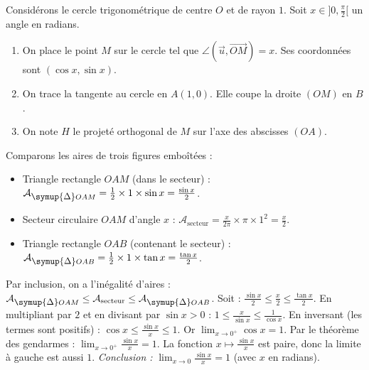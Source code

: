 \documentclass[11pt]{article}
\newcommand{\cle}[1]{{\popxbold\color{popdark}#1}}
\def\triangle{\mathord{\scalebox{0.9}{$\symup{\Delta}$}}}%
\begin{document}
\begin{experience}[Démonstration géométrique de $\lim_{x \to 0} \frac{\sin x}{x} = 1$]
Considérons le cercle trigonométrique de centre $O$ et de rayon $1$. Soit $x \in ]0, \frac{\pi}{2}[$ un angle en \cle{radians}.
\begin{enumerate}
    \item On place le point $M$ sur le cercle tel que $\angle(\vec{u}, \vec{OM}) = x$. Ses coordonnées sont $(\cos x, \sin x)$.
    \item On trace la tangente au cercle en $A(1,0)$. Elle coupe la droite $(OM)$ en $B$.
    \item On note $H$ le projeté orthogonal de $M$ sur l'axe des abscisses $(OA)$.
\end{enumerate}
Comparons les aires de trois figures emboîtées :
\begin{itemize}
    \item Triangle rectangle $OAM$ (dans le secteur) : $\mathcal{A}_{\triangle OAM} = \frac{1}{2} \times 1 \times \sin x = \frac{\sin x}{2}$.
    \item Secteur circulaire $OAM$ d'angle $x$ : $\mathcal{A}_{\text{secteur}} = \frac{x}{2\pi} \times \pi \times 1^2 = \frac{x}{2}$.
    \item Triangle rectangle $OAB$ (contenant le secteur) : $\mathcal{A}_{\triangle OAB} = \frac{1}{2} \times 1 \times \tan x = \frac{\tan x}{2}$.
\end{itemize}
Par inclusion, on a l'inégalité d'aires : $\mathcal{A}_{\triangle OAM} \le \mathcal{A}_{\text{secteur}} \le \mathcal{A}_{\triangle OAB}$.
Soit : $\frac{\sin x}{2} \le \frac{x}{2} \le \frac{\tan x}{2}$.
En multipliant par $2$ et en divisant par $\sin x > 0$ : $1 \le \frac{x}{\sin x} \le \frac{1}{\cos x}$.
En inversant (les termes sont positifs) : $\cos x \le \frac{\sin x}{x} \le 1$.
Or $\lim_{x \to 0^+} \cos x = 1$. Par le théorème des gendarmes : $\lim_{x \to 0^+} \frac{\sin x}{x} = 1$.
La fonction $x \mapsto \frac{\sin x}{x}$ est paire, donc la limite à gauche est aussi $1$.
\emph{Conclusion :} $\lim_{x \to 0} \frac{\sin x}{x} = 1$ (avec $x$ en radians).
\end{experience}
\end{document}
